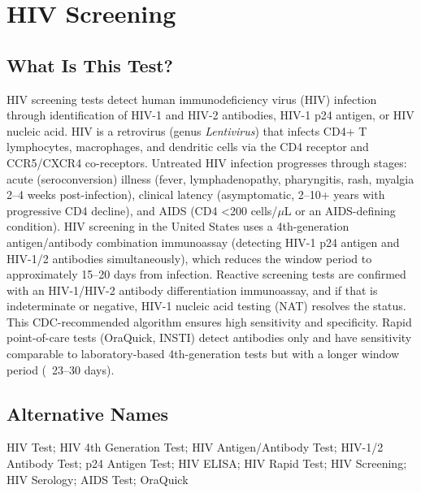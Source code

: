 \chapter{HIV Screening}

\section*{What Is This Test?}
HIV screening tests detect human immunodeficiency virus (HIV) infection through identification of HIV-1 and HIV-2 antibodies, HIV-1 p24 antigen, or HIV nucleic acid. HIV is a retrovirus (genus \textit{Lentivirus}) that infects CD4+ T lymphocytes, macrophages, and dendritic cells via the CD4 receptor and CCR5/CXCR4 co-receptors. Untreated HIV infection progresses through stages: acute (seroconversion) illness (fever, lymphadenopathy, pharyngitis, rash, myalgia 2--4 weeks post-infection), clinical latency (asymptomatic, 2--10+ years with progressive CD4 decline), and AIDS (CD4 <200 cells/$\mu$L or an AIDS-defining condition). HIV screening in the United States uses a 4th-generation antigen/antibody combination immunoassay (detecting HIV-1 p24 antigen and HIV-1/2 antibodies simultaneously), which reduces the window period to approximately 15--20 days from infection. Reactive screening tests are confirmed with an HIV-1/HIV-2 antibody differentiation immunoassay, and if that is indeterminate or negative, HIV-1 nucleic acid testing (NAT) resolves the status. This CDC-recommended algorithm ensures high sensitivity and specificity. Rapid point-of-care tests (OraQuick, INSTI) detect antibodies only and have sensitivity comparable to laboratory-based 4th-generation tests but with a longer window period (~23--30 days).

\section*{Alternative Names}
HIV Test; HIV 4th Generation Test; HIV Antigen/Antibody Test; HIV-1/2 Antibody Test; p24 Antigen Test; HIV ELISA; HIV Rapid Test; HIV Screening; HIV Serology; AIDS Test; OraQuick

